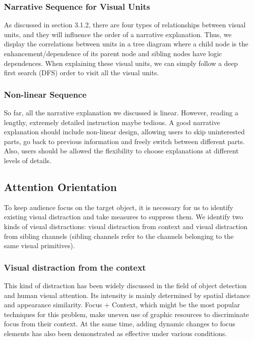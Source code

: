 \subsubsection{Narrative Sequence for Visual Units} 
As discussed in section 3.1.2, there are four types of relationships between visual units, and they will influence the order of a narrative explanation. Thus, we display the correlations between units in a tree diagram where a child node is the enhancement/dependence of its parent node and sibling nodes have logic dependences. When explaining these visual units, we can simply follow a deep first search (DFS) order to visit all the visual units.

\subsubsection{Non-linear Sequence}
So far, all the narrative explanation we discussed is linear. However, reading a lengthy, extremely detailed instruction maybe tedious. A good narrative explanation should include non-linear design, allowing users to skip uninterested parts, go back to previous information and freely switch between different parts. Also, users should be allowed the flexibility to choose explanations at different levels of details. 

\subsection{Attention Orientation}
To keep audience focus on the target object, it is necessary for us to identify existing visual distraction and take measures to suppress them. 
We identify two kinds of visual distractions: visual distraction from context and visual distraction from sibling channels (sibling channels refer to the channels belonging to the same visual primitives). 

\subsubsection{Visual distraction from the context}
This kind of distraction has been widely discussed in the field of object detection and human visual attention. \cite{nothdurft_salience_2000, standage_modelling_2005}Its intensity is mainly  determined by spatial distance and appearance similarity. \cite{wolfe_guided_1994}
Focus + Context, which might be the most popular techniques for this problem, make uneven use of graphic resources to discriminate focus from their context. At the same time, adding dynamic changes to focus elements has also been demonstrated as effective under various conditions\cite{waldner_attractive_2014}. 


